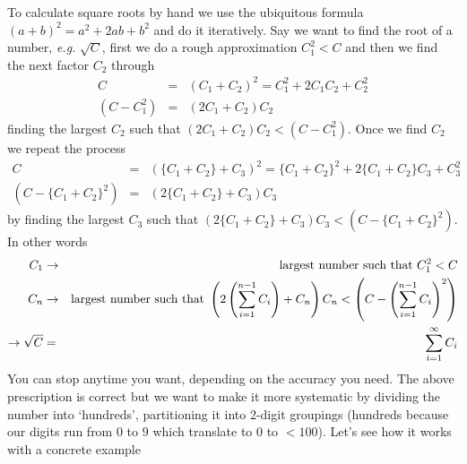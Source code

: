 \documentclass[aps,preprint,preprintnumbers,nofootinbib,showpacs,prd]{revtex4-1}
\newcommand{\eg}{{\it e.g.} }
\newcommand{\nbea}{\begin{eqnarray*}}
\newcommand{\neea}{\end{eqnarray*}}
\begin{document}
To calculate square roots by hand we use the ubiquitous formula $(a + b)^2 = a^2 + 2ab + b^2$ and do it iteratively. Say we want to find the root of a number, \eg $\sqrt{C}$, first we do a rough approximation $C_1^2 < C$ and then we find the next factor $C_2$ through
%
\nbea
C & = & (C_1 + C_2)^2 = C_1^2 + 2C_1C_2 + C_2^2 \\
(C - C_1^2) & = & (2C_1 + C_2)C_2
\neea
%
finding the largest $C_2$ such that $(2C_1 + C_2)C_2 < (C - C_1^2)$. Once we find $C_2$ we repeat the process
%
\nbea
C & = & (\{C_1 + C_2\} + C_3)^2 = \{C_1 + C_2\}^2 + 2\{C_1 + C_2\}C_3 + C_3^2 \\
(C - \{C_1 + C_2\}^2) & = & (2\{C_1 + C_2\} + C_3)C_3
\neea
%
by finding the largest $C_3$ such that $(2\{C_1 + C_2\} + C_3)C_3 < (C - \{C_1 + C_2\}^2)$. In other words
%
\nbea
C_1 & \rightarrow & {\rm largest~number~such~that~}C_1^2 < C\\
C_n & \rightarrow & {\rm largest~number~such~that~}\left ( 2\left ( \sum_{i=1}^{n-1} C_i \right ) + C_n \right ) C_n < \left ( C - \left ( \sum_{i=1}^{n-1} C_i \right )^2 \right ) \\
\rightarrow \sqrt{C} & = & \sum_{i=1}^{\infty} C_i
\neea
%
You can stop anytime you want, depending on the accuracy you need. The above prescription is correct but we want to make it more systematic by dividing the number into `hundreds', partitioning it into 2-digit groupings (hundreds because our digits run from $0$ to $9$ which translate to $0$ to $<100$). Let's see how it works with a concrete example
\end{document}
